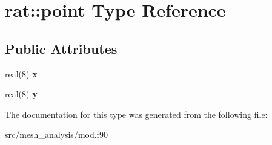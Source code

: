 \hypertarget{structrat_1_1point}{\section{rat\-:\-:point Type Reference}
\label{structrat_1_1point}
}
\subsection*{Public Attributes}
\begin{DoxyCompactItemize}
\item 
\hypertarget{structrat_1_1point_a49bb1aa8485fb0f3d57f2f0a2b03cf14}{real(8) {\bfseries x}}\label{structrat_1_1point_a49bb1aa8485fb0f3d57f2f0a2b03cf14}

\item 
\hypertarget{structrat_1_1point_a30d89b7a1f32336c99c3cb4c1493f06e}{real(8) {\bfseries y}}\label{structrat_1_1point_a30d89b7a1f32336c99c3cb4c1493f06e}

\end{DoxyCompactItemize}


The documentation for this type was generated from the following file\-:\begin{DoxyCompactItemize}
\item 
src/mesh\-\_\-analysis/mod.\-f90\end{DoxyCompactItemize}
